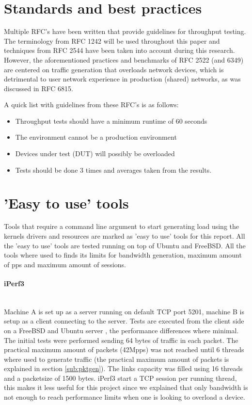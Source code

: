 \section{Standards and best practices}\label{sub:rfc}
Multiple RFC's have been written that provide guidelines for throughput testing.
The terminology from RFC 1242\cite{rfc1242} will be used throughout this paper and techniques from RFC 2544 \cite{rfc2544} have been taken into account during this research.
However, the aforementioned practices and benchmarks of RFC 2522 (and 6349\cite{rfc6349}) are centered on traffic generation that overloads network devices, which is detrimental to user network experience in production (shared) networks, as was discussed in RFC 6815\cite{rfc6815}.

A quick list with guidelines from these RFC's is as follows:

\begin{itemize}
\item{Throughput tests should have a minimum runtime of 60 seconds}
\item{The environment cannot be a production environment}
\item{Devices under test (DUT) will possibly be overloaded}
\item{Tests should be done 3 times and averages taken from the results.}
\end{itemize} 

\section{'Easy to use' tools}
Tools that require a command line argument to start generating load using the kernels drivers and resources are marked as 'easy to use' tools for this report.  
All the 'easy to use' tools are tested running on top of Ubuntu and FreeBSD.
All the tools where used to finds its limits for bandwidth generation, maximum amount of pps and maximum amount of sessions.

\paragraph{iPerf3}\mbox{}\\
Machine A is set up as a server running on default TCP port 5201, machine B is setup as a client connecting to the server. 
Tests are executed from the client side on a FreeBSD and Ubuntu server , the performance differences where minimal. 
The initial tests were performed sending 64 bytes of traffic in each packet. The practical maximum amount of packets (42Mpps) was not reached until 6 threads where used to generate traffic (the practical maximum amount of packets is explained in section \ref{sub:pktgen}). 
The links capacity was filled using 16 threads and a packetsize of 1500 bytes. 
iPerf3 start a TCP session per running thread, this makes it less useful for this project since we explained that only bandwidth is not enough to reach performance limits when one is looking to overload a device.

